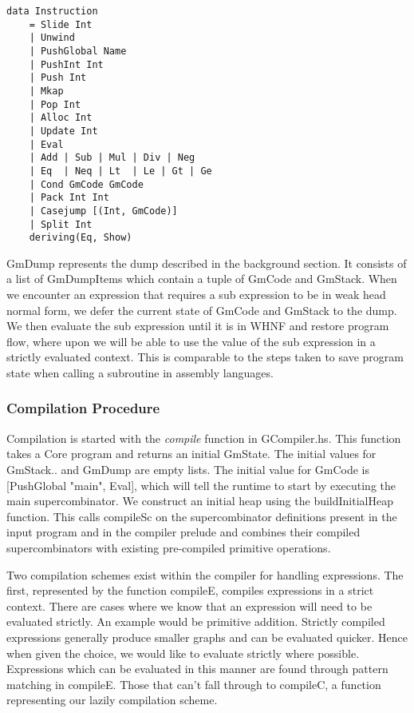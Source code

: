 \begin{verbatim}
data Instruction 
    = Slide Int 
    | Unwind
    | PushGlobal Name 
    | PushInt Int 
    | Push Int 
    | Mkap
    | Pop Int
    | Alloc Int 
    | Update Int
    | Eval
    | Add | Sub | Mul | Div | Neg
    | Eq  | Neq | Lt  | Le | Gt | Ge
    | Cond GmCode GmCode
    | Pack Int Int
    | Casejump [(Int, GmCode)]
    | Split Int
    deriving(Eq, Show)
\end{verbatim}


GmDump represents the dump described in the background section.
It consists of a list of GmDumpItems which contain a tuple of
GmCode and GmStack. When we encounter an expression that 
requires a sub expression to be in weak head normal form, we
defer the current state of GmCode and GmStack to the dump.
We then evaluate the sub expression until it is in WHNF and restore
program flow, where upon we will be able to use the value of the
sub expression in a strictly evaluated context. This is 
comparable to the steps taken to save program state when
calling a subroutine in assembly languages. 

\subsubsection{Compilation Procedure}
Compilation is started with the \emph{compile} function in 
GCompiler.hs. This function takes a Core program and 
returns an initial GmState. The initial values for GmStack..
and GmDump are empty lists. The initial value for GmCode
is [PushGlobal "main", Eval], which will tell the runtime
to start by executing the main supercombinator. We construct 
an initial heap using the buildInitialHeap
function. This calls compileSc on the supercombinator definitions 
present in the input program and in the compiler prelude and combines 
their compiled supercombinators with existing pre-compiled
primitive operations. 

Two compilation schemes exist within the compiler for handling
expressions. The first, represented by the function compileE,
compiles expressions in a strict context. There are cases 
where we know that an expression will need to be evaluated
strictly. An example would be primitive addition. Strictly
compiled expressions generally produce smaller graphs and can
be evaluated quicker. Hence when given the choice, we would
like to evaluate strictly where possible. Expressions which
can be evaluated in this manner are found through pattern
matching in compileE. Those that can't fall through to
compileC, a function representing our lazily compilation
scheme. 

